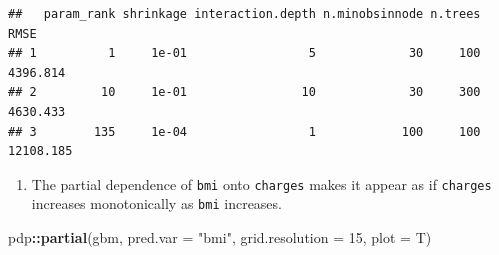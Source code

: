 \documentclass[openany]{book}
\newenvironment{Shaded}{\begin{snugshade}}{\end{snugshade}}
\newcommand{\DataTypeTok}[1]{\textcolor[rgb]{0.13,0.29,0.53}{#1}}
\newcommand{\DecValTok}[1]{\textcolor[rgb]{0.00,0.00,0.81}{#1}}
\newcommand{\KeywordTok}[1]{\textcolor[rgb]{0.13,0.29,0.53}{\textbf{#1}}}
\newcommand{\NormalTok}[1]{#1}
\newcommand{\OperatorTok}[1]{\textcolor[rgb]{0.81,0.36,0.00}{\textbf{#1}}}
\newcommand{\StringTok}[1]{\textcolor[rgb]{0.31,0.60,0.02}{#1}}
\providecommand{\tightlist}{%
  \setlength{\itemsep}{0pt}\setlength{\parskip}{0pt}}
\begin{document}
\begin{Shaded}
\end{Shaded}

\begin{verbatim}
##   param_rank shrinkage interaction.depth n.minobsinnode n.trees      RMSE
## 1          1     1e-01                 5             30     100  4396.814
## 2         10     1e-01                10             30     300  4630.433
## 3        135     1e-04                 1            100     100 12108.185
\end{verbatim}

\begin{enumerate}
\def\labelenumi{\arabic{enumi}.}
\setcounter{enumi}{2}
\tightlist
\item
  The partial dependence of \texttt{bmi} onto \texttt{charges} makes it appear as if \texttt{charges} increases monotonically as \texttt{bmi} increases.
\end{enumerate}

\begin{Shaded}
\begin{Highlighting}[]
\NormalTok{pdp}\OperatorTok{::}\KeywordTok{partial}\NormalTok{(gbm, }\DataTypeTok{pred.var =} \StringTok{"bmi"}\NormalTok{, }\DataTypeTok{grid.resolution =} \DecValTok{15}\NormalTok{, }\DataTypeTok{plot =}\NormalTok{ T)}
\end{Highlighting}
\end{Shaded}
\end{document}
